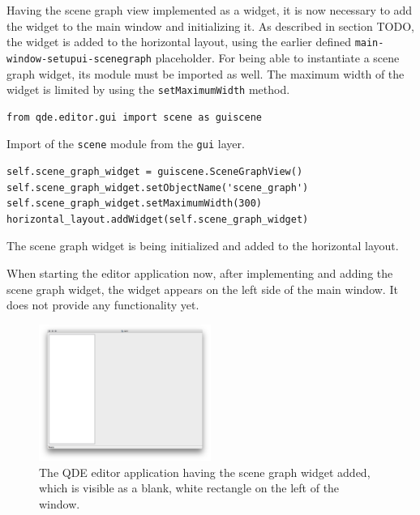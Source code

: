 \documentclass[10pt, openright, notitlepage]{scrreprt}
\begin{document}
Having the scene graph view implemented as a widget, it is now necessary to add
the widget to the main window and initializing it. As described in section
TODO, the widget is added to the horizontal layout, using the earlier defined
\texttt{main-window-setupui-scenegraph} placeholder. For being able to
instantiate a scene graph widget, its module must be imported as well. The
maximum width of the widget is limited by using the \texttt{setMaximumWidth}
method.

\begin{listing}[H]
\begin{verbatim}
from qde.editor.gui import scene as guiscene
\end{verbatim}
\caption{\label{main-window-project-imports}
Import of the \texttt{scene} module from the \texttt{gui} layer.}
\end{listing}

\begin{listing}[H]
\begin{verbatim}
self.scene_graph_widget = guiscene.SceneGraphView()
self.scene_graph_widget.setObjectName('scene_graph')
self.scene_graph_widget.setMaximumWidth(300)
horizontal_layout.addWidget(self.scene_graph_widget)
\end{verbatim}
\caption{\label{main-window-setupui-scenegraph}
The scene graph widget is being initialized and added to the horizontal layout.}
\end{listing}

When starting the editor application now, after implementing and adding the
scene graph widget, the widget appears on the left side of the main window. It
does not provide any functionality yet.

\begin{figure}[H]
\centering
\includegraphics[width=0.5\textwidth]{./images/qde_alpha_02.png}
\caption{\label{fig:editor-alpha-02}
The QDE editor application having the scene graph widget added, which is visible as a blank, white rectangle on the left of the window.}
\end{figure}
\end{document}
